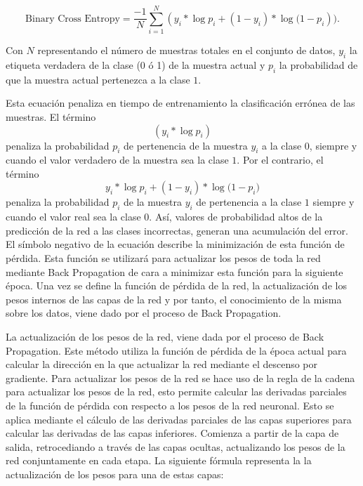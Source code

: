 \documentclass{uathesis-es}
\begin{document}
$$\text{Binary Cross Entropy} = \frac{-1}{N} \sum_{i=1}^{N} (y_{i}*\log{p_{i}}+ (1 - y_{i})*\log{(1-p_{i}})).$$

Con $N$ representando el número de muestras totales en el conjunto de datos, $y_i$ la etiqueta verdadera de la clase (0 ó 1) de la muestra actual y $p_i$ la probabilidad de que la muestra actual pertenezca a la clase $1$.

Esta ecuación penaliza en tiempo de entrenamiento la clasificación errónea de las muestras. El término $$(y_{i}*\log p_{i})$$ penaliza la probabilidad $p_i$ de pertenencia de la muestra $y_i$ a la clase $0$, siempre y cuando el valor verdadero de la muestra sea la clase $1$. Por el contrario, el término 
$$y_{i}*\log{p_{i}}+ (1 - y_{i})*\log{(1-p_{i}})$$
penaliza la probabilidad $p_i$ de la muestra $y_i$ de pertenencia a la clase $1$ siempre y cuando el valor real sea la clase $0$. Así, valores de probabilidad altos de la predicción de la red a las clases incorrectas, generan una acumulación del error. El símbolo negativo de la ecuación describe la minimización de esta función de pérdida. Esta función se utilizará para actualizar los pesos de toda la red mediante Back Propagation de cara a minimizar esta función para la siguiente época. Una vez se define la función de pérdida de la red, la actualización de los pesos internos de las capas de la red y por tanto, el conocimiento de la misma sobre los datos, viene dado por el proceso de Back Propagation.





La actualización de los pesos de la red, viene dada por el proceso de Back Propagation. Este método utiliza la función de pérdida de la época actual para calcular la dirección en la que actualizar la red mediante el descenso por gradiente. Para actualizar los pesos de la red se hace uso de la regla de la cadena para actualizar los pesos de la red, esto permite calcular las derivadas parciales de la función de pérdida con respecto a los pesos de la red neuronal. Esto se aplica mediante el cálculo de las derivadas parciales de las capas superiores para calcular las derivadas de las capas inferiores. Comienza a partir de la capa de salida, retrocediando a través de las capas ocultas, actualizando los pesos de la red conjuntamente en cada etapa. La siguiente fórmula representa la la actualización de los pesos para una de estas capas:
\end{document}
